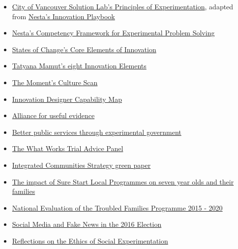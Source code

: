 \documentclass[]{book}
\begin{document}
\begin{itemize}
\item
  \href{https://vancouver.ca/files/cov/navigating-complexity-solutions-lab.pdf}{City of Vancouver Solution Lab's Principles of Experimentation}, adapted from \href{https://www.nesta.org.uk/toolkit/playbook-for-innovation-learning/}{Nesta's Innovation Playbook}
\item
  \href{https://media.nesta.org.uk/documents/Nesta_CompetencyFramework_Guide_July2019.pdf}{Nesta's Competency Framework for Experimental Problem Solving}
\item
  \href{https://states-of-change.org/assets/images/StatesofChange_Curriculum_Craft.png}{States of Change's Core Elements of Innovation}
\item
  \href{https://gww.gov.bc.ca/sites/default/files/group/file/2019/0207/remixtatyanamamutleadingacultureofinnovationlowres.pdf}{Tatyana Mamut's eight Innovation Elements}
\item
  \href{https://info.themoment.is/innovationculture}{The Moment's Culture Scan}
\item
  \href{https://cdn2.hubspot.net/hubfs/3903042/themoment_InnovationDesignersCapabilityMap.pdf}{Innovation Designer Capability Map}
\item
  \href{https://www.alliance4usefulevidence.org/}{Alliance for useful evidence}
\item
  \href{https://www.alliance4usefulevidence.org/publication/better-public-services-through-experimental-government/}{Better public services through experimental government}
\item
  \href{https://www.gov.uk/government/publications/cross-government-trial-advice-panel-role-and-membership}{The What Works Trial Advice Panel}
\item
  \href{https://www.gov.uk/government/consultations/integrated-communities-strategy-green-paper}{Integrated Communities Strategy green paper}
\item
  \href{https://assets.publishing.service.gov.uk/government/uploads/system/uploads/attachment_data/file/495329/The_impact_of_Sure_Start_local_programmes_on_7-year-olds_and_their_families.pdf}{The impact of Sure Start Local Programmes on seven year olds and their families}
\item
  \href{https://assets.publishing.service.gov.uk/government/uploads/system/uploads/attachment_data/file/786891/National_evaluation_of_the_Troubled_Families_Programme_2015_to_2020_family_outcomes___national_and_local_datasets_part_4.pdf}{National Evaluation of the Troubled Families Programme 2015 - 2020}
\item
  \href{https://pubs.aeaweb.org/doi/pdfplus/10.1257/jep.31.2.211}{Social Media and Fake News in the 2016 Election}
\item
  \href{https://www.degruyter.com/view/journals/jgd/6/1/article-p87.xml}{Reflections on the Ethics of Social Experimentation}
\end{itemize}
\end{document}
